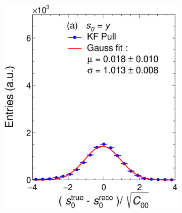 \begin{figure}[t]
     \centering
     \begin{subfigure}{0.32\textwidth}
         \centering
         \includegraphics[width=\textwidth]{figures/ch4-KF_NDGArLite/MC/ILRM+KF/UnitKFEnd_p0.eps}
         \caption{}
         \label{fig:resp0KF_GArLite_ILRM+KF}
     \end{subfigure}
     \begin{subfigure}{0.32\textwidth}
         \centering

\end{subfigure}
\end{figure}
